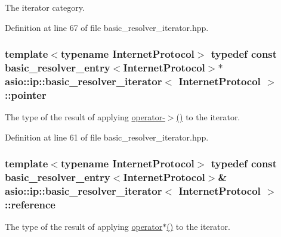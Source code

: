The iterator category. 



Definition at line 67 of file basic\+\_\+resolver\+\_\+iterator.\+hpp.

\hypertarget{classasio_1_1ip_1_1basic__resolver__iterator_a6bb629a7663540e1ceeb55a96dfc4d86}{}
\subsubsection[{pointer}]{\setlength{\rightskip}{0pt plus 5cm}template$<$typename Internet\+Protocol$>$ typedef const {\bf basic\+\_\+resolver\+\_\+entry}$<$Internet\+Protocol$>$$\ast$ {\bf asio\+::ip\+::basic\+\_\+resolver\+\_\+iterator}$<$ Internet\+Protocol $>$\+::{\bf pointer}}\label{classasio_1_1ip_1_1basic__resolver__iterator_a6bb629a7663540e1ceeb55a96dfc4d86}


The type of the result of applying \hyperlink{classasio_1_1ip_1_1basic__resolver__iterator_a378f8ec7cc93a80e69d83cd202d76935}{operator-\/$>$()} to the iterator. 



Definition at line 61 of file basic\+\_\+resolver\+\_\+iterator.\+hpp.

\hypertarget{classasio_1_1ip_1_1basic__resolver__iterator_ac0c7c52cd6c6cc46ebf02a29c1a61c66}{}
\subsubsection[{reference}]{\setlength{\rightskip}{0pt plus 5cm}template$<$typename Internet\+Protocol$>$ typedef const {\bf basic\+\_\+resolver\+\_\+entry}$<$Internet\+Protocol$>$\& {\bf asio\+::ip\+::basic\+\_\+resolver\+\_\+iterator}$<$ Internet\+Protocol $>$\+::{\bf reference}}\label{classasio_1_1ip_1_1basic__resolver__iterator_ac0c7c52cd6c6cc46ebf02a29c1a61c66}


The type of the result of applying \hyperlink{classasio_1_1ip_1_1basic__resolver__iterator_a5066e44d7e003dd08cc7b6c7caa8fb4f}{operator$\ast$()} to the iterator. 




